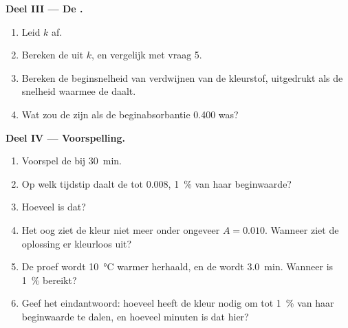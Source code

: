 \begin{problem}
\medskip
\noindent\textbf{Deel III --- De .}
\begin{enumerate}[resume]
  \item Leid $k$ af.
  \item Bereken de  uit $k$, en vergelijk met vraag 5.
  \item Bereken de beginsnelheid van verdwijnen van de kleurstof,
        uitgedrukt als de snelheid waarmee de  daalt.
  \item Wat zou de  zijn als de beginabsorbantie 0.400 was?
\end{enumerate}

\medskip
\noindent\textbf{Deel IV --- Voorspelling.}
\begin{enumerate}[resume]
  \item Voorspel de  bij \qty{30}{min}.
  \item Op welk tijdstip daalt de  tot 0.008, \qty{1}{\percent}
        van haar beginwaarde?
  \item Hoeveel  is dat?
  \item Het oog ziet de kleur niet meer onder ongeveer $A = 0.010$. Wanneer
        ziet de oplossing er kleurloos uit?
  \item De proef wordt \qty{10}{\celsius} warmer herhaald, en de
         wordt \qty{3.0}{min}. Wanneer is
        \qty{1}{\percent} bereikt?
  \item Geef het eindantwoord: hoeveel  heeft de kleur
        nodig om tot \qty{1}{\percent} van haar beginwaarde te dalen, en
        hoeveel minuten is dat hier?
\end{enumerate}
\end{problem}

